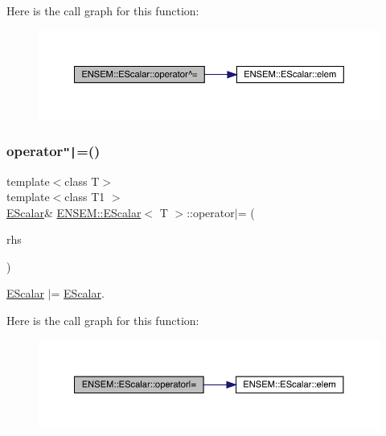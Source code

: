 Here is the call graph for this function\+:
\nopagebreak
\begin{figure}[H]
\begin{center}
\leavevmode
\includegraphics[width=350pt]{d0/d82/classENSEM_1_1EScalar_a42c2a63d2eda81643ae8145068db3a8e_cgraph}
\end{center}
\end{figure}
\mbox{\label{classENSEM_1_1EScalar_a95469ba3db6456ae2fa0c6d86d082c0a}} 
\subsubsection{\texorpdfstring{operator\texttt{"|}=()}{operator|=()}\hspace{0.1cm}{\footnotesize\ttfamily [1/2]}}
{\footnotesize\ttfamily template$<$class T$>$ \\
template$<$class T1 $>$ \\
\mbox{\hyperlink{classENSEM_1_1EScalar}{E\+Scalar}}\& \mbox{\hyperlink{classENSEM_1_1EScalar}{E\+N\+S\+E\+M\+::\+E\+Scalar}}$<$ T $>$\+::operator$\vert$= (\begin{DoxyParamCaption}\item[{const \mbox{\hyperlink{classENSEM_1_1EScalar}{E\+Scalar}}$<$ T1 $>$ \&}]{rhs }\end{DoxyParamCaption})\hspace{0.3cm}{\ttfamily [inline]}}



\mbox{\hyperlink{classENSEM_1_1EScalar}{E\+Scalar}} $\vert$= \mbox{\hyperlink{classENSEM_1_1EScalar}{E\+Scalar}}. 

Here is the call graph for this function\+:
\nopagebreak
\begin{figure}[H]
\begin{center}
\leavevmode
\includegraphics[width=350pt]{d0/d82/classENSEM_1_1EScalar_a95469ba3db6456ae2fa0c6d86d082c0a_cgraph}
\end{center}
\end{figure}
\mbox{\label{classENSEM_1_1EScalar_a95469ba3db6456ae2fa0c6d86d082c0a}} 
